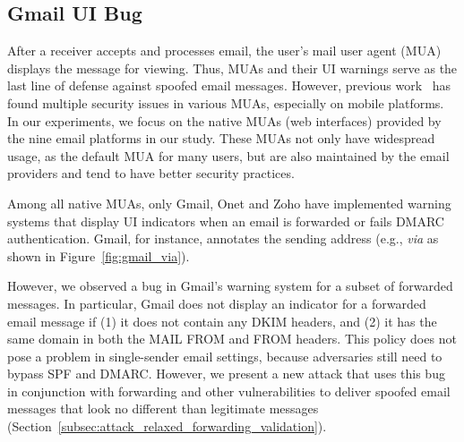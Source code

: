 \subsection{Gmail UI Bug}
\label{subsec:ui_bug}
After a receiver accepts and processes email,
the user's mail user agent (MUA) displays the message for viewing.
Thus, MUAs and their UI warnings serve as the last line of defense against spoofed email messages.
However, previous work~\cite{hu_end--end_nodate,shen2020weak,chen2020composition} has found multiple security issues in various MUAs, especially on mobile platforms.
In our experiments, we focus on the native MUAs (web interfaces) provided by the nine email platforms in our study.
These MUAs not only have widespread usage, as the default MUA for many users,
but are also maintained by the email providers and tend to have better security practices.

Among all native MUAs, only Gmail, Onet and Zoho have implemented warning
systems that display UI indicators when an email is forwarded or fails
DMARC authentication.  Gmail, for instance, annotates the
sending address (e.g.,  \textit{via}  as shown in Figure~\ref{fig:gmail_via}).


However, we observed a bug in Gmail's warning system for a subset of forwarded
messages. In particular, Gmail does not display an indicator for a forwarded
email message if (1) it does not contain any DKIM headers, and (2) it has the
same domain in both the \textsc{MAIL FROM} and \textsc{FROM} headers.
This policy does not pose a problem in single-sender email settings, because adversaries still need to bypass SPF and DMARC.
However, we present a new attack that uses this bug in conjunction with forwarding and other vulnerabilities to deliver spoofed email messages that look no
different than legitimate messages (Section~\ref{subsec:attack_relaxed_forwarding_validation}).

